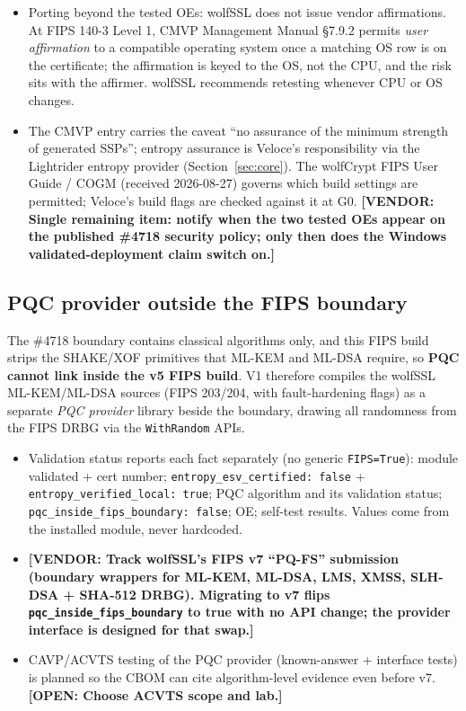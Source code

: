 \documentclass[10pt]{article}
\newcommand{\dep}[1]{\textcolor{warnred}{\sffamily\bfseries\small [VENDOR: #1]}}
\newcommand{\open}[1]{\textcolor{fipsgold}{\sffamily\bfseries\small [OPEN: #1]}}
\newcommand{\code}[1]{\texttt{\small #1}}
\begin{document}
\begin{itemize}
{        Azure Standard\_D2s\_v4)}. CAVP validation 36918 records the algorithm testing.
        A completed-but-unpublished OE must not be represented as current CMVP module/OE
        approval; \code{validation\_status()} reports the Windows OE as
        \code{pending\_publication} until the SP update lands.
  \item Porting beyond the tested OEs: wolfSSL does not issue vendor affirmations. At
        FIPS 140-3 Level 1, CMVP Management Manual \S7.9.2 permits \emph{user
        affirmation} to a compatible operating system once a matching OS row is on the
        certificate; the affirmation is keyed to the OS, not the CPU, and the risk sits
        with the affirmer. wolfSSL recommends retesting whenever CPU or OS changes.
  \item The CMVP entry carries the caveat ``no assurance of the minimum strength of
        generated SSPs''; entropy assurance is Veloce's responsibility via the Lightrider
        entropy provider (Section~\ref{sec:core}). The wolfCrypt FIPS User Guide / COGM
        (received 2026-08-27) governs which build settings are permitted; Veloce's build
        flags are checked against it at G0. \dep{Single remaining item: notify when the
        two tested OEs appear on the published \#4718 security policy; only then does the
        Windows validated-deployment claim switch on.}
\end{itemize}

\subsection{PQC provider outside the FIPS boundary}\label{sec:pqc-boundary}
The \#4718 boundary contains classical algorithms only, and this FIPS build strips the
SHAKE/XOF primitives that ML-KEM and ML-DSA require, so \textbf{PQC cannot link inside
the v5 FIPS build}. V1 therefore compiles the wolfSSL ML-KEM/ML-DSA sources (FIPS 203/204,
with fault-hardening flags) as a separate \emph{PQC provider} library beside the boundary,
drawing all randomness from the FIPS DRBG via the \code{*WithRandom} APIs.

\begin{itemize}
  \item Validation status reports each fact separately (no generic \code{FIPS=True}):
        module validated + cert number; \code{entropy\_esv\_certified:\ false} +
        \code{entropy\_verified\_local:\ true}; PQC algorithm
        and its validation status; \code{pqc\_inside\_fips\_boundary:\ false}; OE;
        self-test results. Values come from the installed module, never hardcoded.
  \item \dep{Track wolfSSL's FIPS v7 ``PQ-FS'' submission (boundary wrappers for ML-KEM,
        ML-DSA, LMS, XMSS, SLH-DSA + SHA-512 DRBG). Migrating to v7 flips
        \code{pqc\_inside\_fips\_boundary} to true with no API change; the provider
        interface is designed for that swap.}
  \item CAVP/ACVTS testing of the PQC provider (known-answer + interface tests) is planned
        so the CBOM can cite algorithm-level evidence even before v7.
        \open{Choose ACVTS scope and lab.}
\end{itemize}
\end{document}
